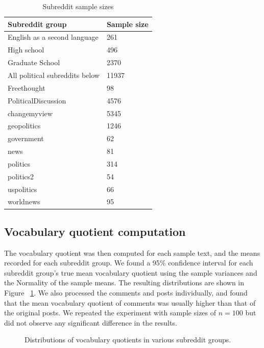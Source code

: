 \documentclass[sigconf]{acmart}
\begin{document}
\begin{table}
  \caption{Subreddit sample sizes}
  \label{tab:sizes}
  \begin{tabular}{ll}
  \toprule
  Subreddit group & Sample size \\
  \midrule
  English as a second language & 261 \\ 
  High school & 496 \\ 
  Graduate School & 2370 \\ 
  All political subreddits below & 11937 \\ 
  Freethought & 98 \\ 
  PoliticalDiscussion & 4576 \\ 
  changemyview & 5345 \\ 
  geopolitics & 1246 \\ 
  government & 62 \\ 
  news & 81 \\ 
  politics & 314 \\ 
  politics2 & 54 \\ 
  uspolitics & 66 \\ 
  worldnews & 95\\
  \bottomrule
  \end{tabular}
\end{table}

\subsection{Vocabulary quotient computation}

The vocabulary quotient was then computed for each sample text, and the
means recorded for each subreddit group. We found a 95\% confidence interval
for each subreddit group's true mean vocabulary quotient using the sample
variances and the Normality of the sample means. The resulting distributions
are shown in Figure ~\ref{fig:distributions}. We also processed the comments and posts
individually, and found that the mean vocabulary quotient of comments was
usually higher than that of the original posts. We repeated the experiment
with sample sizes of $n=100$ but did not observe any significant difference
in the results.
\begin{figure}
  \centering
  \setlength\fboxsep{0pt}
  \setlength\fboxrule{0.25pt}
  \caption{Distributions of vocabulary quotients in various subreddit groups.}
  \label{fig:distributions}
\end{figure}
\end{document}
